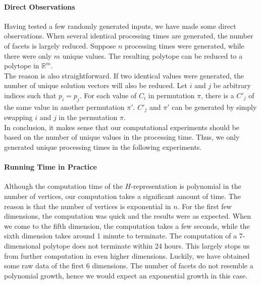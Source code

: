 \documentclass[12pt,letterpaper]{article}
\newcommand*{\R}{\mathbb{R}}
\begin{document}
\paragraph{Direct Observations}
Having tested a few randomly generated inputs, we have made some direct observations.
When several identical processing times are generated, the number of facets is largely reduced.
Suppose $n$ processing times were generated, while there were only $m$ unique values. 
The resulting polytope can be reduced to a polytope in $\R^m$.\\
The reason is also straightforward. If two identical values were generated, 
the number of unique solution vectors will also be reduced. Let $i$ and $j$ be 
arbitrary indices such that $p_i = p_j$. For each value of $C_i$ in permutation $\pi$, 
there is a $C'_j$ of the same value in another permutation $\pi'$. 
$C'_j$ and $\pi'$ can be generated by simply swapping $i$ and $j$ in the permutation $\pi$. \\
In conclusion, it makes sense that our computational experiments should be based 
on the number of unique values in the processing time. 
Thus, we only generated unique processing times in the following experiments. 

\paragraph{Running Time in Practice}
Although the computation time of the $H$-representation is polynomial in the number of vertices, our computation takes 
a significant amount of time. The reason is that the number of vertices is exponential in $n$. 
For the first few dimensions, the computation was quick and the results were as expected.
When we come to the fifth dimension, the computation takes a few seconds, while the sixth dimension 
takes around 1 minute to terminate. The computation of a 7-dimensional polytope does not terminate within 24 hours. 
This largely stops us from further computation in even higher dimensions. 
Luckily, we have obtained some raw data of the first 6 dimensions. 
The number of facets do not resemble a polynomial growth, hence we would expect an exponential growth in this case.

 
\end{document}
